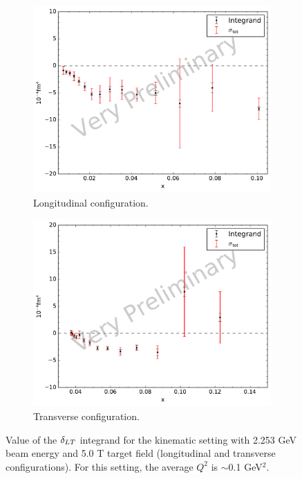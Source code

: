 \begin{figure}[p!]
  \centering
  \begin{subfigure}[t]{0.79\textwidth}
    \includegraphics[width=\textwidth]{figs/dlt-model-22535000.pdf}
    \caption{Longitudinal configuration. \label{C8S5F2a}}
  \end{subfigure}
  \begin{subfigure}[t]{0.79\textwidth}
    \includegraphics[width=\textwidth]{figs/dlt-model-22535090.pdf}
    \caption{Transverse configuration. \label{C8S5F2b}}
  \end{subfigure}
  \caption[$\dlt$ integrand with $E=2.253$ GeV and $B=5.0$ T.]{Value of the $\dlt$ integrand for the kinematic setting with 2.253 GeV beam energy and 5.0 T target field (longitudinal and transverse configurations). For this setting, the average $Q^2$ is $\sim$0.1 GeV${}^2$. \label{C8S5F2}}
\end{figure}

